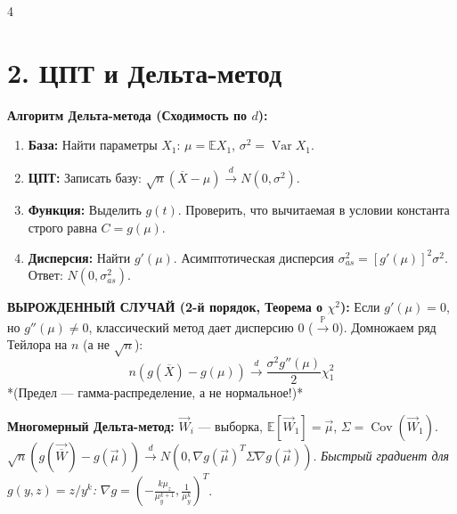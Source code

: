 \documentclass[8pt, a4paper, landscape]{extarticle}
\newcommand{\E}{\mathbb{E}}
\renewcommand{\P}{\mathbb{P}}
\DeclareMathOperator{\Var}{Var}
\DeclareMathOperator{\Cov}{Cov}
\begin{document}
\begin{multicols*}{4}
\section*{2. ЦПТ и Дельта-метод}
\textbf{Алгоритм Дельта-метода (Сходимость по $d$):}
\begin{enumerate}
    \item \textbf{База:} Найти параметры $X_1$: $\mu = \E X_1$, $\sigma^2 = \Var X_1$.
    \item \textbf{ЦПТ:} Записать базу: $\sqrt{n}(\overline{X} - \mu) \xrightarrow{d} N(0, \sigma^2)$.
    \item \textbf{Функция:} Выделить $g(t)$. Проверить, что вычитаемая в условии константа строго равна $C = g(\mu)$.
    \item \textbf{Дисперсия:} Найти $g'(\mu)$. Асимптотическая дисперсия $\sigma_{as}^2 = [g'(\mu)]^2 \sigma^2$. Ответ: $N(0, \sigma_{as}^2)$.
\end{enumerate}

\textbf{ВЫРОЖДЕННЫЙ СЛУЧАЙ (2-й порядок, Теорема о $\chi^2$):}
Если $g'(\mu)=0$, но $g''(\mu)\ne 0$, классический метод дает дисперсию 0 ($\xrightarrow{\P} 0$). Домножаем ряд Тейлора на $n$ (а не $\sqrt{n}$):
$$ n(g(\overline{X}) - g(\mu)) \xrightarrow{d} \frac{\sigma^2 g''(\mu)}{2} \chi^2_1 $$
*(Предел — гамма-распределение, а не нормальное!)*

\textbf{Многомерный Дельта-метод:} $\vec{W}_i$ --- выборка, $\E[\vec{W}_1]=\vec{\mu}$, $\Sigma = \Cov(\vec{W}_1)$.
$\sqrt{n}(g(\vec{\overline{W}}) - g(\vec{\mu})) \xrightarrow{d} N(0, \nabla g(\vec{\mu})^T \Sigma \nabla g(\vec{\mu}))$.
\textit{Быстрый градиент для $g(y,z) = z/y^k$:} $\nabla g = \left(-\frac{k\mu_z}{\mu_y^{k+1}}, \frac{1}{\mu_y^k}\right)^T$.


\end{multicols*}
\end{document}

